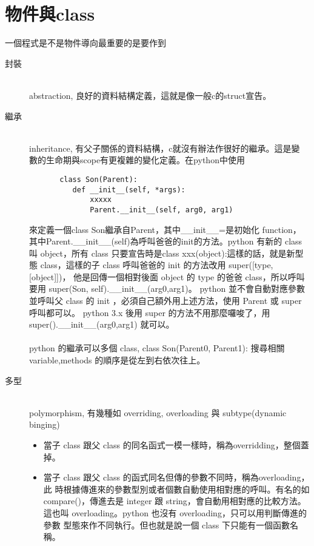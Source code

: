 \section{物件與class}
一個程式是不是物件導向最重要的是要作到
\begin{description}
  \item [封裝] \hfill \\
    abstraction, 良好的資料結構定義，這就是像一般c的struct宣告。
  \item [繼承] \hfill \\
    inheritance, 有父子關係的資料結構，c就沒有辦法作很好的繼承。這是變
       數的生命期與scope有更複雜的變化定義。在python中使用
       \begin{verbatim}
       class Son(Parent):
          def __init__(self, *args):
              xxxxx
              Parent.__init__(self, arg0, arg1)
       \end{verbatim}
       來定義一個class Son繼承自Parent，其中\_\_init\_\_=是初始化 function，
       其中Parent.\_\_init\_\_(self)為呼叫爸爸的init的方法。python 有新的 class
       叫 object，所有 class 只要宣告時是class xxx(object):這樣的話，就是新型態
       class，這樣的子 class 呼叫爸爸的 init 的方法改用 super([type, [object]])，
       他是回傳一個相對後面 object 的 type 的爸爸 class，所以呼叫要用
       super(Son, self).\_\_init\_\_(arg0,arg1)。 python 並不會自動對應參數
       並呼叫父 class 的 init ，必須自己額外用上述方法，使用 Parent 或 super 
       呼叫都可以。 python 3.x 後用 super 的方法不用那麼囉唆了，用
       super().\_\_init\_\_(arg0,arg1) 就可以。
       \\\\
       python 的繼承可以多個 class, class Son(Parent0, Parent1):
       搜尋相關 variable,methods 的順序是從左到右依次往上。
  \item [多型] \hfill \\
    polymorphism, 有幾種如 overriding, overloading 與 subtype(dynamic binging)
    \begin{itemize}
      \item 當子 class 跟父 class 的同名函式一模一樣時，稱為overridding，整個蓋掉。
      \item 當子 class 跟父 class 的函式同名但傳的參數不同時，稱為overloading，此
            時根據傳進來的參數型別或者個數自動使用相對應的呼叫。有名的如
            compare()，傳進去是 integer 跟 string，會自動用相對應的比較方法。
            這也叫 overloading。python 也沒有 overloading，只可以用判斷傳進的參數
            型態來作不同執行。但也就是說一個 class 下只能有一個函數名稱。

\end{itemize}
\end{description}
